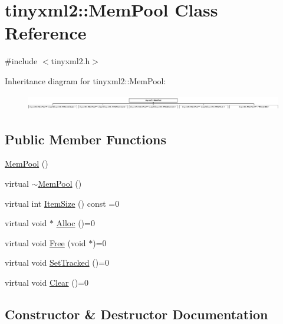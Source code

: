 \hypertarget{classtinyxml2_1_1_mem_pool}{}\section{tinyxml2\+:\+:Mem\+Pool Class Reference}
\label{classtinyxml2_1_1_mem_pool}


{\ttfamily \#include $<$tinyxml2.\+h$>$}

Inheritance diagram for tinyxml2\+:\+:Mem\+Pool\+:\begin{figure}[H]
\begin{center}
\leavevmode
\includegraphics[height=0.691358cm]{classtinyxml2_1_1_mem_pool}
\end{center}
\end{figure}
\subsection*{Public Member Functions}
\begin{DoxyCompactItemize}
\item 
\hyperlink{classtinyxml2_1_1_mem_pool_a9101a0083d7370c85bd5aaaba7157f84}{Mem\+Pool} ()
\item 
virtual \hyperlink{classtinyxml2_1_1_mem_pool_ae55ad9e3faeca702e6ccbb38fdbcad72}{$\sim$\+Mem\+Pool} ()
\item 
virtual int \hyperlink{classtinyxml2_1_1_mem_pool_a0c518d49e3a94bde566f61e13b7240bb}{Item\+Size} () const =0
\item 
virtual void $\ast$ \hyperlink{classtinyxml2_1_1_mem_pool_a4f977b5fed752c0bbfe5295f469d6449}{Alloc} ()=0
\item 
virtual void \hyperlink{classtinyxml2_1_1_mem_pool_a49e3bfac2cba2ebd6776b31e571f64f7}{Free} (void $\ast$)=0
\item 
virtual void \hyperlink{classtinyxml2_1_1_mem_pool_ac5804dd1387b2e4de5eef710076a0db1}{Set\+Tracked} ()=0
\item 
virtual void \hyperlink{classtinyxml2_1_1_mem_pool_a74fcdef9756917c8ae19fbbb4d658ed7}{Clear} ()=0
\end{DoxyCompactItemize}


\subsection{Constructor \& Destructor Documentation}
\mbox{\label{classtinyxml2_1_1_mem_pool_a9101a0083d7370c85bd5aaaba7157f84}} 
